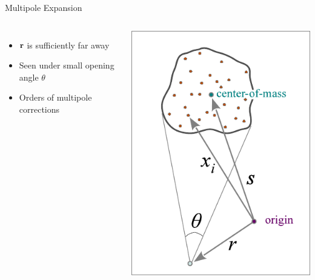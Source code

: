 \begin{frame}{Multipole Expansion}
	\begin{columns}
		\begin{itemize}
			\item $\vb{r}$ is sufficiently far
			      away
			\item  Seen under small opening angle
			      $\theta$
			\item  Orders of multipole corrections
		\end{itemize}
		\includegraphics[width=\linewidth]{figures/multipole.png}
	\end{columns}
\end{frame}

